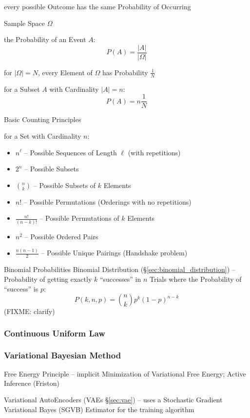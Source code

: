 every possible Outcome has the same Probability of Occurring

Sample Space $\Omega$

the Probability of an Event $A$:
\[
  P(A) = \frac{|A|}{|\Omega|}
\]

for $|\Omega| = N$, every Element of $\Omega$ has Probability $\frac{1}{N}$

for a Subset $A$ with Cardinality $|A| = n$:
\[
  P(A) = n \frac{1}{N}
\]


Basic Counting Principles

for a Set with Cardinality $n$:
\begin{itemize}
  \item $n^\ell$ -- Possible Sequences of Length $\ell$ (with repetitions)
  \item $2^n$ -- Possible Subsets
  \item $\binom{n}{k}$ -- Possible Subsets of $k$ Elements
  \item $n!$ -- Possible Permutations (Orderings with no repetitions)
  \item $\frac{n!}{(n-k)!}$ -- Possible Permutations of $k$ Elements
  \item $n^2$ -- Possible Ordered Pairs
  \item $\frac{n(n-1)}{2}$ -- Possible Unique Pairings (Handshake problem)
\end{itemize}


Binomial Probabilities \fist Binomial Distribution
(\S\ref{sec:binomial_distribution}) -- Probability of getting exactly $k$
``successes'' in $n$ Trials where the Probability of ``success'' is $p$:
\[
  P(k,n,p) = \binom{n}{k}p^k(1-p)^{n-k}
\]
(FIXME: clarify)



\subsubsection{Continuous Uniform Law}\label{sec:continuous_uniform_law}

\subsubsection{Variational Bayesian Method}\label{sec:variational_bayesian}

Free Energy Principle -- implicit Minimization of Variational Free Energy;
Active Inference (Friston)

Variational AutoEncoders (VAEs \S\ref{sec:vae}) -- uses a Stochastic Gradient
Variational Bayes (SGVB) Estimator for the training algorithm



